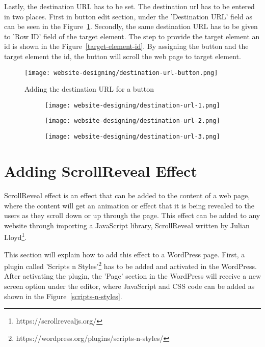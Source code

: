 Lastly, the destination URL has to be set. The destination \ac{url} has to be entered in two places. First in button edit section, under the 'Destination URL' field as can be seen in the Figure~\ref{destination-url-button}.  Secondly, the same destination URL has to be given to 'Row ID' field of the target element. The step to provide the target element an id is shown in the Figure~\ref{target-element-id}. By assigning the button and the target element the id, the button will scroll the web page to target element.

\begin{figure}[ht]
\centering
\caption{Adding the destination URL for a button}
\label{destination-url-button}
\texttt{[image: website-designing/destination-url-button.png]}
\end{figure}

\begin{figure}[ht]
\caption{Adding Row Id to the Target Element}
\label{target-element-id}
\centering
	\begin{subfigure}{.49\linewidth}
	\centering
	\texttt{[image: website-designing/destination-url-1.png]}
	\end{subfigure}
	\begin{subfigure}{0.49\linewidth}
	\centering
	\texttt{[image: website-designing/destination-url-2.png]}
	\end{subfigure}
	\begin{subfigure}{0.49\linewidth}
	\centering
	\texttt{[image: website-designing/destination-url-3.png]}
	\end{subfigure}
\end{figure}

\section{Adding ScrollReveal Effect}
ScrollReveal effect is an effect that can be added to the content of a web page, where the content will get an animation or effect that it is being revealed to the users as they scroll down or up through the page. This effect can be added to any website through importing a JavaScript library, ScrollReveal written by Julian Lloyd\footnote{https://scrollrevealjs.org/}.

This section will explain how to add this effect to a WordPress page. First, a plugin called 'Scripts n Styles'\footnote{https://wordpress.org/plugins/scripts-n-styles/} has to be added and activated in the WordPress. After activating the plugin, the 'Page' section in the WordPress will receive a new screen option under the editor, where JavaScript and CSS code can be added as shown in the Figure~\ref{scripts-n-styles}.


